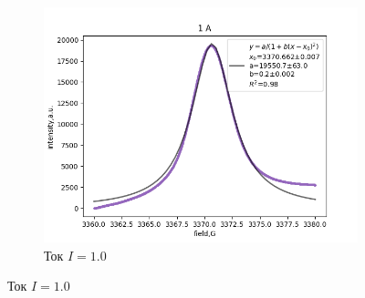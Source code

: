 \documentclass{article}
\begin{document}
\begin{figure}[h!]
  \begin{subfigure}[b]{0.3\linewidth}
    \includegraphics[width=\linewidth]{1/14.png}
    \caption{Ток $I = 1.0$}
  \end{subfigure}
  

\end{figure}
\end{document}
